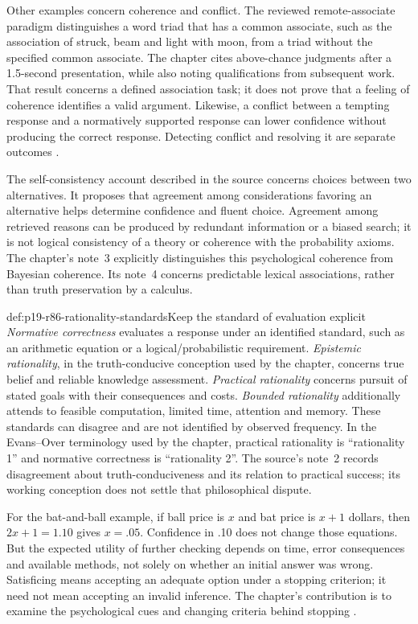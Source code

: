 Other examples concern coherence and conflict. The reviewed remote-associate
paradigm distinguishes a word triad that has a common associate, such as the
association of struck, beam and light with moon, from a triad without the
specified common associate. The chapter cites above-chance judgments after
a 1.5-second presentation, while also noting qualifications from subsequent work.
That result concerns a defined association task; it does not prove that a
feeling of coherence identifies a valid argument. Likewise, a conflict between
a tempting response and a normatively supported response can lower confidence
without producing the correct response. Detecting conflict and resolving it
are separate outcomes
\cite[pp.~519--520]{ThompsonElqayamAckerman2021MetaReasoning}.

The self-consistency account described in the source concerns choices between
two alternatives. It proposes that agreement among considerations favoring an
alternative helps determine confidence and fluent choice. Agreement among
retrieved reasons can be produced by redundant information or a biased search;
it is not logical consistency of a theory or coherence with the probability
axioms. The chapter's note~3 explicitly distinguishes this psychological
coherence from Bayesian coherence. Its note~4 concerns predictable lexical
associations, rather than truth preservation by a calculus.

\begin{hbconvention}{def:p19-r86-rationality-standards}{Keep the standard of evaluation explicit}
\emph{Normative correctness} evaluates a response under an identified standard,
such as an arithmetic equation or a logical/probabilistic requirement.
\emph{Epistemic rationality}, in the truth-conducive conception used by the
chapter, concerns true belief and reliable knowledge assessment.
\emph{Practical rationality} concerns pursuit of stated goals with their
consequences and costs. \emph{Bounded rationality} additionally attends to
feasible computation, limited time, attention and memory.
These standards can disagree and are not identified by observed frequency.
In the Evans--Over terminology used by the chapter, practical rationality is
``rationality 1'' and normative correctness is ``rationality 2''.
The source's note~2 records disagreement about truth-conduciveness and its
relation to practical success; its working conception does not settle that
philosophical dispute.
\end{hbconvention}

For the bat-and-ball example, if ball price is \(x\) and bat price is
\(x+1\) dollars, then \(2x+1=1.10\) gives \(x=.05\).
Confidence in .10 does not change those equations. But the expected utility
of further checking depends on time, error consequences and available
methods, not solely on whether an initial answer was wrong. Satisficing means
accepting an adequate option under a stopping criterion; it need not mean
accepting an invalid inference. The chapter's contribution is to examine the
psychological cues and changing criteria behind stopping
\cite[pp.~519--521]{ThompsonElqayamAckerman2021MetaReasoning}.

